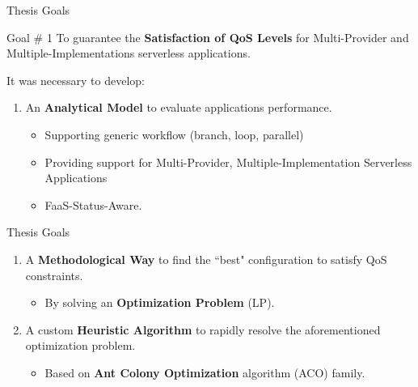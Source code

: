 \documentclass[13.5pt]{beamer}
\newcommand{\B}[1]{\textcolor{TorVergataColor}{\textbf{#1}}}
\begin{document}

\begin{frame}{Thesis Goals}
	
	\begin{block}{Goal $\#$ 1}
		\centering
	To guarantee the \B{Satisfaction of QoS Levels} for Multi-Provider and Multiple-Implementations serverless applications. 
	\end{block}

	\vspace{\baselineskip}
	It was necessary to develop:
	\vspace{\baselineskip} 
	
	\begin{enumerate}
	
		\item An \B{Analytical Model} to evaluate applications performance.
		\begin{itemize}
			\item Supporting generic workflow (branch, loop, parallel)
			\item Providing support for Multi-Provider, Multiple-Implementation Serverless Applications
			\item FaaS-Status-Aware.
		\end{itemize}
		
		
		\vspace{\baselineskip} 
		
	\end{enumerate}
	\end{frame} 


\begin{frame}{Thesis Goals}
	
	\begin{enumerate}
		\justifying
		\setcounter{enumi}{1}
		\item A \B{Methodological Way} to find the ``best" configuration to satisfy QoS constraints.
		\begin{itemize}
			\item By solving an \B{Optimization Problem} (LP).
		\end{itemize}
		
		\vspace{\baselineskip}
		
		\item A custom \B{Heuristic Algorithm} to rapidly resolve the aforementioned optimization problem.
		\begin{itemize}
			\item Based on \B{Ant Colony Optimization} algorithm (ACO) family.
		\end{itemize}
		
	\end{enumerate}
	
\end{frame} 
\end{document}
